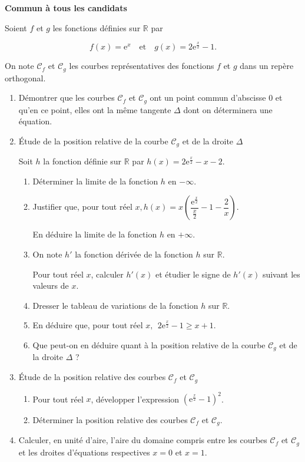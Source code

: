 \documentclass[10pt]{article}
\newcommand{\R}{\mathbb{R}}
\begin{document}
\textbf{Commun  à tous les candidats}

\medskip
Soient $f$ et $g$ les fonctions définies sur $\R$ par 

\[f(x) = \text{e}^x \quad  \text{et} \quad  g(x) = 2\text{e}^{\frac{x}{2}} - 1.\]
 
On note $\mathcal{C}_{f}$ et $\mathcal{C}_{g}$ les courbes représentatives des fonctions $f$ et $g$ dans un repère orthogonal.

\medskip
 
\begin{enumerate}
\item Démontrer que les courbes $\mathcal{C}_{f}$ et $\mathcal{C}_{g}$ ont un point commun d'abscisse $0$ et qu'en ce point, elles ont la même tangente 
$\Delta$ dont on déterminera une équation. 
\item Étude de la position relative de la courbe $\mathcal{C}_{g}$ et de la droite $\Delta$
 
Soit $h$ la fonction définie sur $\R$ par $h(x) = 2\text{e}^{\frac{x}{2}} - x - 2$. 
	\begin{enumerate}
		\item Déterminer la limite de la fonction $h$ en $- \infty$. 
		\item Justifier que, pour tout réel $x, h(x) = x\left(\dfrac{\text{e}^{\frac{x}{2}}}{\frac{x}{2}} - 1 - \dfrac{2}{x}\right)$. 

En déduire la limite de la fonction $h$ en $+ \infty$. 
		\item On note $h'$ la fonction dérivée de la fonction $h$ sur $\R$.
		 
Pour tout réel $x$, calculer $h'(x)$ et étudier le signe de $h'(x)$ suivant les valeurs de $x$.
		\item Dresser le tableau de variations de la fonction $h$ sur $\R$. 
		\item En déduire que, pour tout réel $x,\:\: 2\text{e}^{\frac{x}{2}} - 1 \geqslant x + 1$. 
		\item Que peut-on en déduire quant à la position relative de la courbe $\mathcal{C}_{g}$ et de la droite $\Delta$ ?
	\end{enumerate} 
\item Étude de la position relative des courbes $\mathcal{C}_{f}$ et $\mathcal{C}_{g}$ 
	\begin{enumerate}
		\item Pour tout réel $x$, développer l'expression $\left(\text{e}^{\frac{x}{2}} - 1\right)^2$. 
		\item Déterminer la position relative des courbes $\mathcal{C}_{f}$ et $\mathcal{C}_{g}$.
	\end{enumerate} 
\item Calculer, en unité d'aire, l'aire du domaine compris entre les courbes $\mathcal{C}_{f}$ et $\mathcal{C}_{g}$ et les droites d'équations respectives $x = 0$ et $x = 1$.
\end{enumerate}
\end{document}
